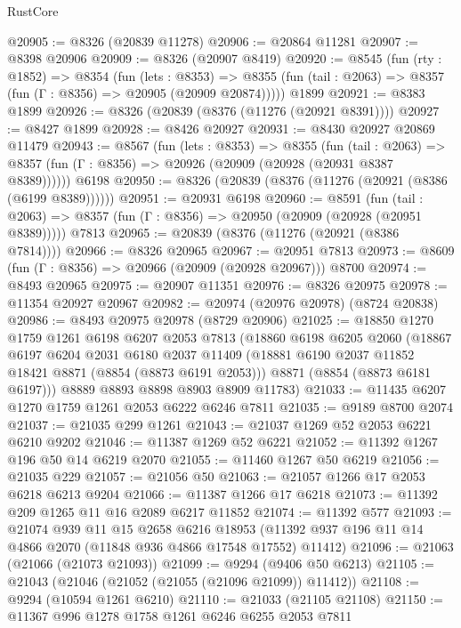 \begin{lexlean}{RustCore}
\begin{coremodule}
@20905 := @8326 (@20839 @11278)
@20906 := @20864 @11281
@20907 := @8398 @20906
@20909 := @8326 (@20907 @8419)
@20920 := @8545
    (fun (rty : @1852) =>
    @8354
      (fun (lets : @8353) =>
      @8355 (fun (tail : @2063) => @8357 (fun (Γ : @8356) => @20905 (@20909 @20874)))))
    @1899
@20921 := @8383 @1899
@20926 := @8326 (@20839 (@8376 (@11276 (@20921 @8391))))
@20927 := @8427 @1899
@20928 := @8426 @20927
@20931 := @8430 @20927 @20869 @11479
@20943 := @8567
    (fun (lets : @8353) =>
    @8355
      (fun (tail : @2063) =>
      @8357 (fun (Γ : @8356) => @20926 (@20909 (@20928 (@20931 @8387 @8389))))))
    @6198
@20950 := @8326 (@20839 (@8376 (@11276 (@20921 (@8386 (@6199 @8389))))))
@20951 := @20931 @6198
@20960 := @8591
    (fun (tail : @2063) => @8357 (fun (Γ : @8356) => @20950 (@20909 (@20928 (@20951 @8389)))))
    @7813
@20965 := @20839 (@8376 (@11276 (@20921 (@8386 @7814))))
@20966 := @8326 @20965
@20967 := @20951 @7813
@20973 := @8609 (fun (Γ : @8356) => @20966 (@20909 (@20928 @20967))) @8700
@20974 := @8493 @20965
@20975 := @20907 @11351
@20976 := @8326 @20975
@20978 := @11354 @20927 @20967
@20982 := @20974 (@20976 @20978) (@8724 @20838)
@20986 := @8493 @20975 @20978 (@8729 @20906)
@21025 := @18850
    @1270
    @1759
    @1261
    @6198
    @6207
    @2053
    @7813
    (@18860
      @6198
      @6205
      @2060
      (@18867
        @6197
        @6204
        @2031
        @6180
        @2037
        @11409
        (@18881 @6190 @2037 @11852 @18421 @8871 (@8854 (@8873 @6191 @2053)))
        @8871
        (@8854 (@8873 @6181 @6197)))
      @8889
      @8893
      @8898
      @8903
      @8909
      @11783)
@21033 := @11435 @6207 @1270 @1759 @1261 @2053 @6222 @6246 @7811
@21035 := @9189 @8700 @2074
@21037 := @21035 @299 @1261
@21043 := @21037 @1269 @52 @2053 @6221 @6210 @9202
@21046 := @11387 @1269 @52 @6221
@21052 := @11392 @1267 @196 @50 @14 @6219 @2070
@21055 := @11460 @1267 @50 @6219
@21056 := @21035 @229
@21057 := @21056 @50
@21063 := @21057 @1266 @17 @2053 @6218 @6213 @9204
@21066 := @11387 @1266 @17 @6218
@21073 := @11392 @209 @1265 @11 @16 @2089 @6217 @11852
@21074 := @11392 @577
@21093 := @21074
    @939
    @11
    @15
    @2658
    @6216
    @18953
    (@11392 @937 @196 @11 @14 @4866 @2070 (@11848 @936 @4866 @17548 @17552) @11412)
@21096 := @21063 (@21066 (@21073 @21093))
@21099 := @9294 (@9406 @50 @6213)
@21105 := @21043 (@21046 (@21052 (@21055 (@21096 @21099)) @11412))
@21108 := @9294 (@10594 @1261 @6210)
@21110 := @21033 (@21105 @21108)
@21150 := @11367
    @996
    @1278
    @1758
    @1261
    @6246
    @6255
    @2053
    @7811

\end{coremodule}
\end{lexlean}
